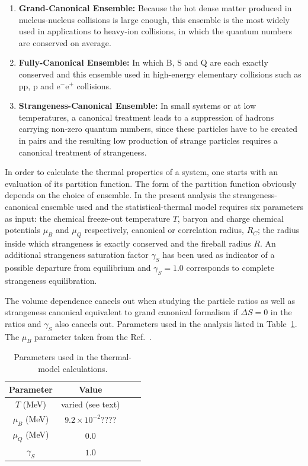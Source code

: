\begin{enumerate}
\item \textbf{Grand-Canonical Ensemble:} Because the hot dense matter produced in nucleus-nucleus collisions is large enough, this ensemble is the most widely used in applications to heavy-ion collisions, in which the quantum numbers are conserved on average. 
\item \textbf{Fully-Canonical Ensemble:} In which B, S and Q are each exactly conserved and this ensemble used in high-energy elementary collisions such as pp, p\pbar{} and e$^{-}$e$^{+}$ collisions.
\item \textbf{Strangeness-Canonical Ensemble:}  In small systems or at low temperatures, a canonical treatment leads to a suppression of hadrons carrying non-zero quantum numbers, since these particles have to be created in pairs and the resulting low production of strange particles requires a canonical treatment of strangeness.  
 \end{enumerate}
 In order to calculate the thermal properties of a system, one starts with an evaluation of its partition function. The form of the partition function obviously depends on the choice of ensemble. In the present analysis the strangeness-canonical ensemble used and the statistical-thermal model requires six parameters as input: the chemical freeze-out temperature $T$, baryon and charge chemical potentials $\mu_{B}$ and $\mu_{Q}$ respectively, canonical or correlation radius, $R_{C}$; the radius inside which strangeness is exactly conserved and the fireball radius $R$. An additional strangeness saturation factor $\gamma_{S}$ has been used as indicator of a possible departure from equilibrium and $\gamma_{S}=1.0$ corresponds to complete strangeness equilibration.
 

The volume dependence cancels out when studying the particle ratios as well as strangeness canonical equivalent to grand canonical formalism if $\Delta S=0$ in the ratios and $\gamma_{S}$ also cancels out. Parameters used in the analysis listed in Table~\ref{jfonts}. The $\mu_{B}$ parameter taken from the Ref.~\cite{Cleymans:2011pe}.
 
 \begin{center}
\begin{table}[h]
\centering
\caption{\label{jfonts} Parameters used in the thermal-model calculations.} 
 \begin{tabular}{@{}*{2}{cc}}
\hline
Parameter&Value\\
\hline
$T$ (MeV)&varied (see text)\\
$\mu_{B}$ (MeV)&$9.2\times10^{-2}$????\\ 
$\mu_{Q}$ (MeV)&$0.0$\\ 
$\gamma_{S}$&$1.0$\\ 
\hline
\end{tabular}
\end{table}
\end{center}
\newpage
